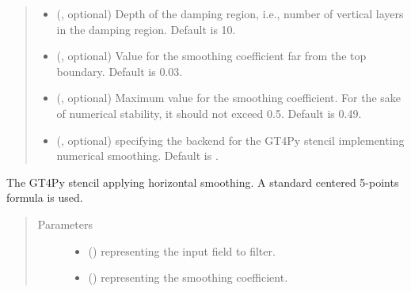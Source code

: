 \documentclass[letterpaper,10pt,english]{sphinxmanual}
\begin{document}
\begin{fulllineitems}
\begin{fulllineitems}
\begin{quote}
\begin{description}
\begin{itemize}
\item {} 
 (, optional) \textendash{} Depth of the damping region, i.e., number of vertical layers in the damping region. Default is 10.

\item {} 
 (, optional) \textendash{} Value for the smoothing coefficient far from the top boundary. Default is 0.03.

\item {} 
 (, optional) \textendash{} Maximum value for the smoothing coefficient. For the sake of numerical stability, it should not
exceed 0.5. Default is 0.49.

\item {} 
 (, optional) \textendash{}  specifying the backend for the GT4Py stencil implementing numerical
smoothing. Default is .

\end{itemize}

\end{description}\end{quote}

\end{fulllineitems}


\begin{fulllineitems}
\label{\detokenize{api:dycore.horizontal_smoothing.HorizontalSmoothingSecondOrderXZ._stencil_defs}}
The GT4Py stencil applying horizontal smoothing. A standard centered 5-points formula is used.
\begin{quote}\begin{description}
\item[{Parameters}] \leavevmode\begin{itemize}
\item {} 
 () \textendash{}  representing the input field to filter.

\item {} 
 () \textendash{}  representing the smoothing coefficient.


\end{itemize}
\end{description}
\end{quote}
\end{fulllineitems}
\end{fulllineitems}
\end{document}

